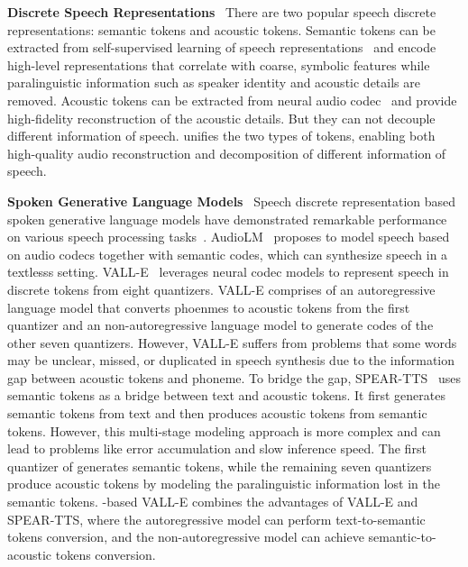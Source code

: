 
\noindent\textbf{Discrete Speech Representations}~ There are two popular speech discrete representations: semantic tokens and
acoustic tokens. Semantic tokens can be extracted from self-supervised learning of speech representations~\citep{hsu2021hubert, chung2021w2vbert} and encode high-level representations that
correlate with coarse, symbolic features while paralinguistic information such as
speaker identity and acoustic details are removed. Acoustic tokens can be extracted from neural audio codec~\citep{zeghidour2021soundstream,défossez2022high,yang2023hificodec} and provide high-fidelity reconstruction of the acoustic details. But they can not decouple different information of speech. \method unifies the two types of tokens, enabling both high-quality audio reconstruction and decomposition of different information of speech.

\noindent\textbf{Spoken Generative Language Models}~
Speech discrete representation based spoken generative language models have demonstrated remarkable performance on various speech processing tasks~\citep{borsos2022audiolm, wang2023neural, kharitonov2023speak,zhang2023speechgpt}. AudioLM~\citep{borsos2022audiolm} proposes to model speech based on audio codecs together
with semantic codes, which can synthesize speech in a textlesss setting.
VALL-E~\citep{wang2023neural} leverages neural codec models to represent
speech in discrete tokens from eight quantizers. VALL-E comprises of an autoregressive language model that converts phoenmes to acoustic tokens from the first quantizer and an non-autoregressive language model to generate codes of the other seven quantizers. However, VALL-E suffers from problems that some words may be unclear, missed, or duplicated in
speech synthesis due to the information gap between acoustic tokens and phoneme. To bridge the gap, SPEAR-TTS~\citep{kharitonov2023speak} uses semantic tokens as a bridge between text and acoustic tokens.
It first generates semantic tokens from text and then produces acoustic tokens from semantic tokens. However, this multi-stage modeling approach is more complex and can lead to problems like error accumulation and slow inference speed. 
The first quantizer of \method generates semantic tokens, while the remaining seven quantizers produce acoustic tokens by modeling the paralinguistic information lost in the semantic tokens. \method-based VALL-E combines the advantages of VALL-E and SPEAR-TTS, where the autoregressive model can perform text-to-semantic tokens conversion, and the non-autoregressive model can achieve semantic-to-acoustic tokens conversion.


